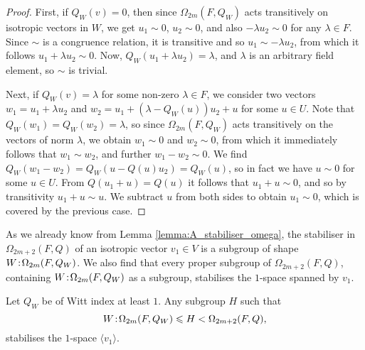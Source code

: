 \begin{proof}
    First, if $Q_W(v) = 0$, then since $\Omega_{2m}(F,Q_W)$ acts transitively on isotropic
    vectors in $W$, we get $u_1 \sim 0$, $u_2 \sim 0$, and also $-\lambda u_2 \sim 0$ for any 
    $\lambda \in F$. Since $\sim$ is a congruence relation, it is transitive and so
    $u_1 \sim -\lambda u_2$, from which it follows $u_1 + \lambda u_2 \sim 0$. Now, 
    $Q_W(u_1 + \lambda u_2) = \lambda$, and $\lambda$ is an arbitrary field element,
    so $\sim$ is trivial.
    
    Next, if $Q_W(v) = \lambda$ for some non-zero $\lambda \in F$, we consider two vectors
    $w_1 = u_1 + \lambda u_2$ and $w_2 = u_1 + (\lambda - Q_W(u))u_2 + u$ for some $u \in U$. 
    Note that $Q_W(w_1) = Q_W(w_2) = \lambda$, so since $\Omega_{2m}(F,Q_W)$
    acts transitively on the vectors of norm $\lambda$, we obtain
    $w_1 \sim 0$ and $w_2 \sim 0$, from which it immediately follows that 
    $w_1 \sim w_2$, and further $w_1 - w_2 \sim 0$. 
    We find $Q_W(w_1 - w_2) = Q_W(u - Q(u)u_2) = Q_W(u)$, so in fact we have
    $u \sim 0$ for some $u \in U$. From $Q(u_1+u) = Q(u)$ it follows that 
    $u_1 + u \sim 0$, and so by transitivity $u_1+u \sim u$. We subtract $u$ from both
    sides to obtain $u_1 \sim 0$, which is covered by the previous case. 
\end{proof}

As we already know from Lemma \ref{lemma:A_stabiliser_omega}, the stabiliser in $\Omega_{2m+2}(F,Q)$
of an isotropic vector $v_1 \in V$ is a subgroup of shape $W\mathord{{\;\!{:}\;\!}}\Omega_{2m}(F,Q_W)$. We also find that
every proper 
subgroup of $\Omega_{2m+2}(F,Q)$, containing $W\mathord{{\;\!{:}\;\!}}\Omega_{2m}(F,Q_W)$ as a subgroup, stabilises 
the $1$-space spanned by $v_1$.

\begin{theorem}
	\label{theorem:A_space_stab}
	Let $Q_W$ be of Witt index at least $1$. Any subgroup $H$ such that
	\begin{equation}
		W\mathord{{\;\!{:}\;\!}}\Omega_{2m}(F,Q_W) \leqslant H < \Omega_{2m+2}(F,Q),
	\end{equation}
	stabilises the $1$-space $\langle v_1 \rangle$. 
\end{theorem}

